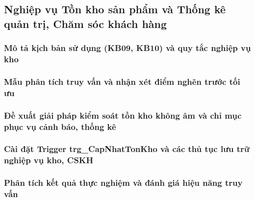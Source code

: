 \subsection{Nghiệp vụ Tồn kho sản phẩm và Thống kê quản trị, Chăm sóc khách hàng}

\subsubsection{Mô tả kịch bản sử dụng (KB09, KB10) và quy tắc nghiệp vụ kho}

\subsubsection{Mẫu phân tích truy vấn và nhận xét điểm nghẽn trước tối ưu}

\subsubsection{Đề xuất giải pháp kiểm soát tồn kho không âm và chỉ mục phục vụ cảnh báo, thống kê}

\subsubsection{Cài đặt Trigger trg\_CapNhatTonKho và các thủ tục lưu trữ nghiệp vụ kho, CSKH}

\subsubsection{Phân tích kết quả thực nghiệm và đánh giá hiệu năng truy vấn}
